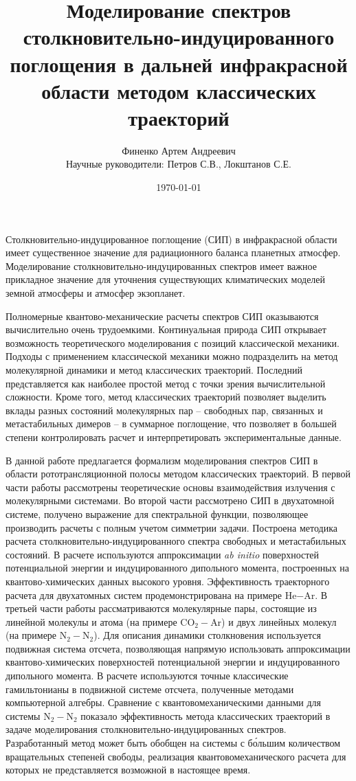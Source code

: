 \documentclass[12pt]{article}
\title{Моделирование спектров столкновительно-индуцированного поглощения в дальней инфракрасной области методом классических траекторий}
\date{\today}
\author{Финенко Артем Андреевич \\ Научные руководители: Петров С.В., Локштанов С.Е.}
\begin{document}
\maketitle

Столкновительно-индуцированное поглощение (СИП) в инфракрасной области имеет существенное значение для радиационного баланса планетных атмосфер. Моделирование столк\-новительно-индуцированных спектров имеет важное прикладное значение для уточнения существующих климатических моделей земной атмосферы и атмосфер экзопланет. \par
Полномерные квантово-механические расчеты спектров СИП оказываются вычислительно очень трудоемкими. Континуальная природа СИП открывает возможность теоретического моделирования с позиций классической механики. Подходы с применением классической механики можно подразделить на метод молекулярной динамики и метод классических траекторий. Последний представляется как наиболее простой метод с точки зрения вычислительной сложности. Кроме того, метод классических траекторий позволяет выделить вклады разных состояний молекулярных пар -- свободных пар, связанных и метастабильных димеров -- в суммарное поглощение, что позволяет в большей степени контролировать расчет и интерпретировать экспериментальные данные. \par  
В данной работе предлагается формализм моделирования спектров СИП в области рототрансляционной полосы методом классических траекторий. В первой части работы рассмотрены теоретические основы взаимодействия излучения с молекулярными системами. Во второй части рассмотрено СИП в двухатомной системе, получено выражение для спектральной функции, позволяющее производить расчеты с полным учетом симметрии задачи. Построена методика расчета столкновительно-индуцированного спектра свободных и метастабильных состояний. В расчете используются аппроксимации \textit{ab initio} поверхностей потенциальной энергии и индуцированного дипольного момента, построенных на квантово-химических данных высокого уровня. Эффективность траекторного расчета для двухатомных систем продемонстрирована на примере He$-$Ar. В третьей части работы рассматриваются молекулярные пары, состоящие из линейной молекулы и атома (на примере CO$_2-$Ar) и двух линейных молекул (на примере N$_2-$N$_2$). Для описания динамики столкновения используется подвижная система отсчета, позволяющая напрямую использовать аппроксимации квантово-химических поверхностей потенциальной энергии и индуцированного дипольного момента. В расчете используются точные классические гамильтонианы в подвижной системе отсчета, полученные методами компьютерной алгебры. Сравнение с квантовомеханическими данными для системы N$_2-$N$_2$ показало эффективность метода классических траекторий в задаче моделирования столкновительно-индуцированных спектров. Разработанный метод может быть обобщен на системы с б\'{о}льшим количеством вращательных степеней свободы, реализация квантовомеханического расчета для которых не представляется возможной в настоящее время. 
\end{document}

